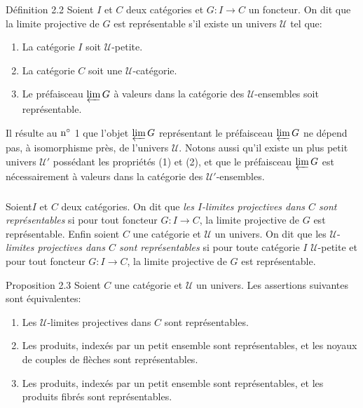 \documentclass[10pt]{../fichiers-configuration-latex/smfart}
\def\labelenumi{(\theenumi)}
\begin{document}
\begin{enonce*}{Définition 2.2}
Soient $I$ et $C$ deux catégories et $G:I\rightarrow C$ un foncteur.
On dit que la limite projective de $G$ est représentable s'il existe
un univers $𝒰$ tel que:
\begin{enumerate}
\renewcommand{\labelenumi}{\theenumi)}
\item La catégorie $I$ soit $𝒰$-petite.

\item La catégorie $C$ soit une $𝒰$-catégorie.

\item Le préfaisceau $\varprojlim G$ à valeurs dans la
  catégorie des $𝒰$-ensembles soit représentable.
\end{enumerate}
\end{enonce*}

Il résulte au ${\rm n^\circ}$ 1 que l'objet $\varprojlim G$
représentant le préfaisceau $\varprojlim G$ ne dépend pas, à
isomorphisme près, de l'univers $𝒰$. Notons aussi qu'il
existe un plus petit univers $𝒰'$ possédant les propriétés
(1) et (2), et que le préfaisceau $\varprojlim G$ est nécessairement
à valeurs dans la catégorie des $𝒰'$-ensembles.

\setcounter{subsection}{2} \setcounter{subsubsection}{0}
\subsubsection{}
Soient\pageoriginale $I$ et $C$ deux catégories. On dit que
\emph{les $I$-limites projectives dans $C$ sont
  représentables} si pour tout foncteur $G:I\rightarrow C$, la
  limite projective de $G$ est représentable. Enfin soient $C$ une
  catégorie et $𝒰$ un univers. On dit que les
  $𝒰$-\emph{limites
  projectives dans $C$ sont représentables} si pour toute
  catégorie $I$ $𝒰$-petite et pour tout foncteur $G:I\rightarrow
  C$, la limite projective de $G$ est représentable.

\begin{enonce*}{Proposition 2.3}
Soient $C$ une catégorie et $𝒰$ un univers. Les assertions suivantes sont équivalentes:
\begin{enumerate}
\renewcommand{\theenumi}{\roman{enumi}}
\renewcommand{\labelenumi}{\theenumi)}
\item Les $𝒰$-limites projectives dans $C$ sont représentables.

\item Les produits, indexés par un petit ensemble sont
  représentables, et les noyaux de couples de flèches sont
  représentables.
\item Les produits, indexés par un petit ensemble sont
  représentables, et les produits fibrés sont représentables.
\end{enumerate}
\end{enonce*}
\end{document}
